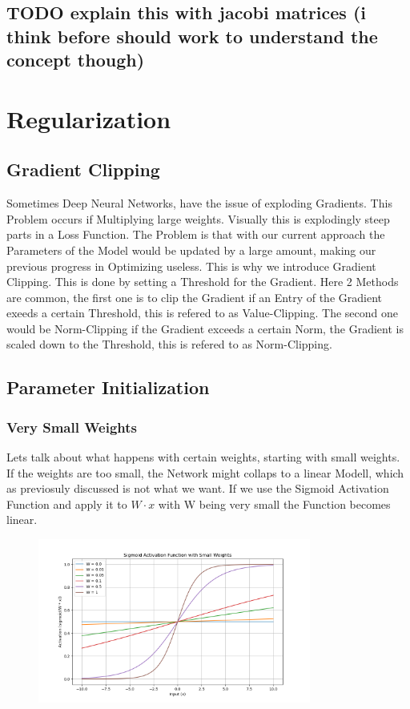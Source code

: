 \documentclass[a4paper]{article}
\begin{document}
\subsection{TODO explain this with jacobi matrices (i think before should work to understand the concept though)}

\section{Regularization}

\subsection{Gradient Clipping}

Sometimes Deep Neural Networks, have the  issue of exploding Gradients. This Problem occurs if Multiplying large weights. Visually this is explodingly steep parts in a Loss Function. The Problem is that with our current approach the Parameters of the Model would be updated by a large amount, making our previous progress in Optimizing useless. 
This is why we introduce Gradient Clipping. This is done by setting a Threshold for the Gradient. Here 2 Methods are common, the first one is to clip the Gradient if an Entry of the Gradient exeeds a certain Threshold, this is refered to as Value-Clipping. The second one would be Norm-Clipping if the Gradient exceeds a 
certain Norm, the Gradient is scaled down to the Threshold, this is refered to as Norm-Clipping.

\subsection{Parameter Initialization}

\subsubsection{Very Small Weights}
Lets talk about what happens with certain weights, starting with small weights. If the weights are too small, the Network might collaps to a linear Modell, which as previosuly discussed is not what we want. If we use the Sigmoid Activation Function and apply it to $W \cdot x$ with W being very small the Function becomes linear.

\begin{figure}[h]
    \centering
    \includegraphics[width=0.8\textwidth]{images/sigmoid_small_weights.png}
    \label{fig:Sigmod Small weights}
\end{figure}
\newpage
\end{document}
